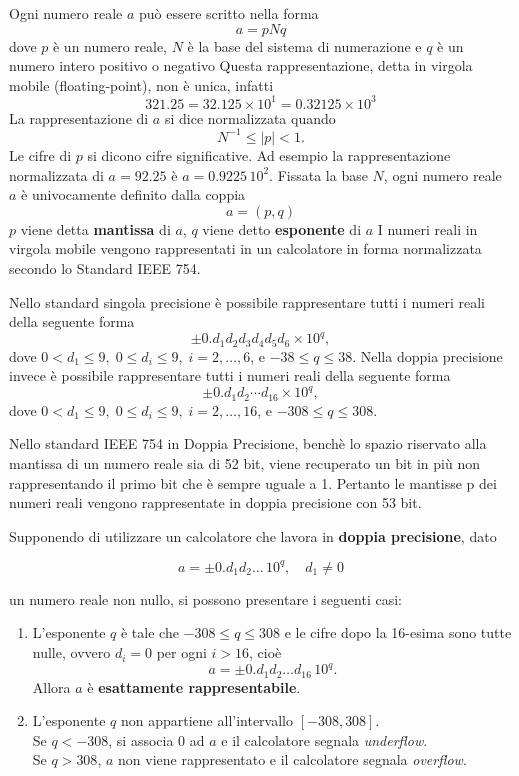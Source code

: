 \documentclass[a4paper,12pt]{article}
\theoremstyle{plain}
\theoremstyle{definition}
\theoremstyle{remark}
\begin{document}
Ogni numero reale $a$ può essere scritto nella forma
\[a = pNq\]
dove $p$ è un numero reale, $N$ è la base del sistema di numerazione e $q$
è un numero intero positivo o negativo
Questa rappresentazione, detta in virgola mobile (floating-point), non
è unica, infatti
\[321.25 = 32.125 \times 10^1 = 0.32125 \times 10^3\]
La rappresentazione di $a$ si dice normalizzata quando
\[N^{-1} \leq |p| < 1.\]
Le cifre di $p$ si dicono cifre significative.
Ad esempio la rappresentazione normalizzata di $a = 92.25$ è
$a = 0.9225\,10^2$.
Fissata la base $N$, ogni numero reale $a$ è univocamente definito dalla
coppia
\[a = (p, q)\]
$p$ viene detta \textbf{mantissa} di $a$, $q$ viene detto \textbf{esponente} di $a$
I numeri reali in virgola mobile vengono rappresentati in un
calcolatore in forma normalizzata secondo lo Standard IEEE 754.

Nello standard singola precisione è possibile rappresentare tutti i numeri reali della seguente forma 
\[\pm0.d_1d_2d_3d_4d_5d_6\times10^q,\]
dove $0<d_1\leq9,\;0\leq d_i\leq9,\;i=2,\ldots,6$, e $-38\leq q\leq 38$.
Nella doppia precisione invece è possibile rappresentare tutti i numeri reali della seguente forma 
\[\pm0.d_1d_2\cdots d_{16}\times10^q,\]
dove $0<d_1\leq9,\;0\leq d_i\leq9,\;i=2,\ldots,16$, e $-308\leq q\leq 308$.

Nello standard IEEE 754 in Doppia Precisione, benchè lo spazio
riservato alla mantissa di un numero reale sia di 52 bit, viene
recuperato un bit in più non rappresentando il primo bit che è sempre
uguale a 1.
Pertanto le mantisse p dei numeri reali vengono rappresentate in
doppia precisione con 53 bit.


Supponendo di utilizzare un calcolatore che lavora in \textbf{doppia precisione}, dato

\[
a = \pm 0.d_1 d_2 \ldots \, 10^q, \quad d_1 \neq 0
\]

un numero reale non nullo, si possono presentare i seguenti casi:

\begin{enumerate}
    \item L'esponente $q$ è tale che $-308 \leq q \leq 308$ e le cifre dopo la 16-esima sono tutte nulle, ovvero $d_i = 0$ per ogni $i > 16$, cioè
    \[
    a = \pm 0.d_1 d_2 \ldots d_{16}\, 10^q.
    \]
    Allora $a$ è \textbf{esattamente rappresentabile}.
    
    \item L'esponente $q$ non appartiene all'intervallo $[-308,308]$. \\
    Se $q < -308$, si associa 0 ad $a$ e il calcolatore segnala \textit{underflow}. \\
    Se $q > 308$, $a$ non viene rappresentato e il calcolatore segnala \textit{overflow}.
\end{enumerate}
\end{document}
